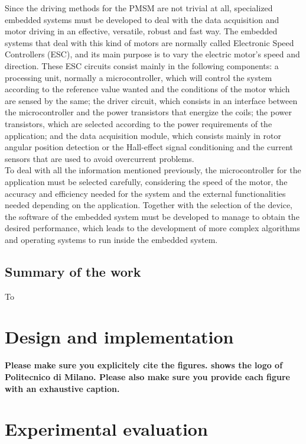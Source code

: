 Since the driving methods for the PMSM are not trivial at all, specialized embedded systems must be developed to deal with the data acquisition and motor driving in an effective, versatile, robust and fast way. The embedded systems that deal with this kind of motors are normally called Electronic Speed Controllers (ESC), and its main purpose is to vary the electric motor's speed and direction. These ESC circuits consist mainly in the following components: a processing unit, normally a microcontroller, which will control the system according to the reference value wanted and the conditions of the motor which are sensed by the same; the driver circuit, which consists in an interface between the microcontroller and the power transistors that energize the coils; the power transistors, which are selected according to the power requirements of the application; and the data acquisition module, which consists mainly in rotor angular position detection or the Hall-effect signal conditioning and the current sensors that are used to avoid overcurrent problems. \\

To deal with all the information mentioned previously, the microcontroller for the application must be selected carefully, considering the speed of the motor, the accuracy and efficiency needed for the system and the external functionalities needed depending on the application. Together with the selection of the device, the software of the embedded system must be developed to manage to obtain the desired performance, which leads to the development of more complex algorithms and operating systems to run inside the embedded system.

\subsection{Summary of the work}
To 
\lipsum[2]

\pagebreak

\section{Design and implementation}
\textbf{Please make sure you explicitely cite the figures.
 shows the logo of Politecnico di Milano.
Please also make sure you provide each figure with an exhaustive caption.}

\lipsum[1-12]



\section{Experimental evaluation}
\lipsum[1]
